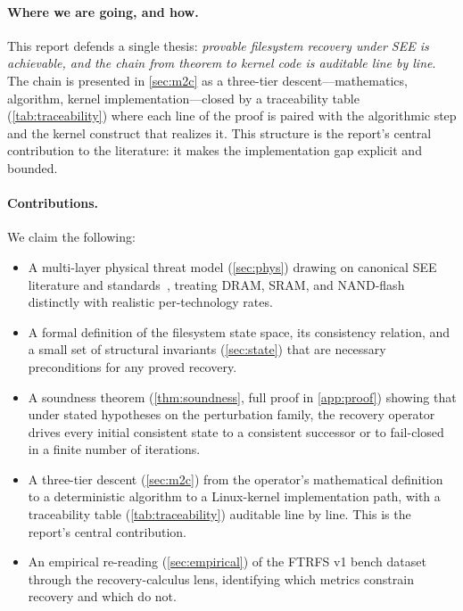 \paragraph{Where we are going, and how.}
This report defends a single thesis: \emph{provable filesystem recovery
under SEE is achievable, and the chain from theorem to kernel code is
auditable line by line}. The chain is presented in
\cref{sec:m2c} as a three-tier descent---mathematics, algorithm,
kernel implementation---closed by a traceability table
(\cref{tab:traceability}) where each line of the proof is paired with
the algorithmic step and the kernel construct that realizes it. This
structure is the report's central contribution to the literature: it
makes the implementation gap explicit and bounded.

\paragraph{Contributions.}
We claim the following:
\begin{itemize}
\item A multi-layer physical threat model
  (\cref{sec:phys}) drawing on canonical SEE literature
  \cite{heinrich1977,petersen1996,dodd2003,baumann2005,normand1996} and
  standards~\cite{jedec89a,nasa-hdbk-4002a,esa-eccs60}, treating DRAM,
  SRAM, and NAND-flash distinctly with realistic per-technology rates.
\item A formal definition of the filesystem state space, its
  consistency relation, and a small set of structural invariants
  (\cref{sec:state}) that are necessary preconditions for any proved
  recovery.
\item A soundness theorem (\cref{thm:soundness}, full proof in
  \cref{app:proof}) showing that under stated hypotheses on the
  perturbation family, the recovery operator drives every initial
  consistent state to a consistent successor or to fail-closed in a
  finite number of iterations.
\item A three-tier descent (\cref{sec:m2c}) from the operator's
  mathematical definition to a deterministic algorithm to a Linux-kernel
  implementation path, with a traceability table
  (\cref{tab:traceability}) auditable line by line. This is the
  report's central contribution.
\item An empirical re-reading (\cref{sec:empirical}) of the FTRFS v1
  bench dataset~\cite{desbrieres2026ftrfs} through the recovery-calculus
  lens, identifying which metrics constrain recovery and which do not.
\end{itemize}

